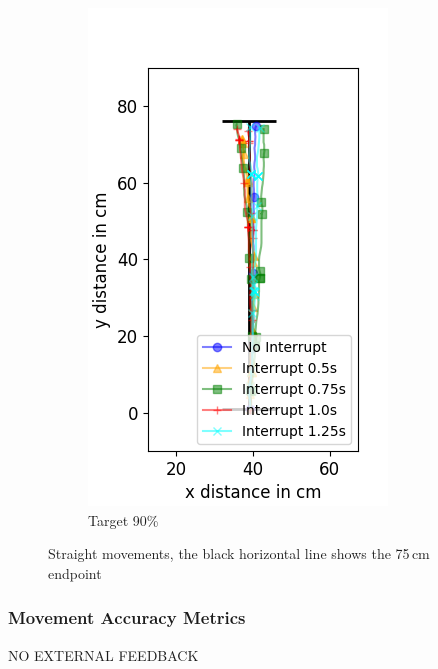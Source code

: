 \begin{figure}
\begin{subfigure}[b]{0.32\textwidth}
		\includegraphics[width=\textwidth]{pics/straight_90.png}
		\caption{Target 90\%}
		\label{fig:stra_exp3}
	\end{subfigure}
	\caption{Straight movements, the black horizontal line shows the 75\,cm endpoint}
	\label{fig:straight_movements}
\end{figure}

\subsubsection{Movement Accuracy Metrics}
NO EXTERNAL FEEDBACK

